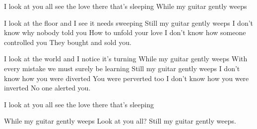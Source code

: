 
I look at you all see the love there that's sleeping
While my guitar gently weeps

I look at the floor and I see it needs sweeping
Still my guitar gently weeps
I don't know why nobody told you
How to unfold your love
I don't know how someone controlled you
They bought and sold you.

I look at the world and I notice it's turning
While my guitar gently weeps
With every mistake we must surely be learning
Still my guitar gently weeps
I don't know how you were diverted
You were perverted too
I don't know how you were inverted
No one alerted you.

I look at you all see the love there that's sleeping

While my guitar gently weeps
Look at you all?
Still my guitar gently weeps. 